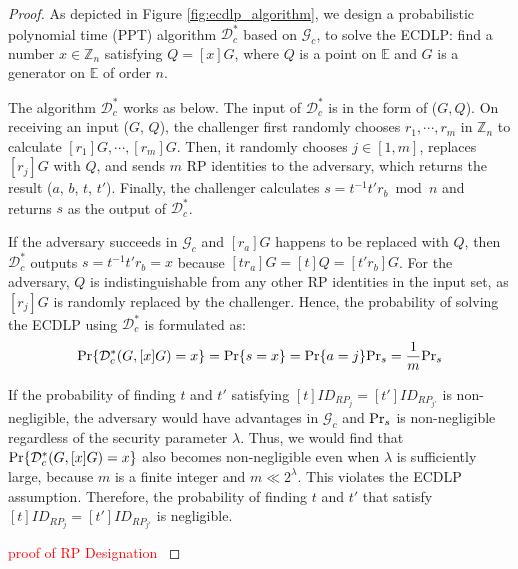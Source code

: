\begin{proof}
As depicted in Figure \ref{fig:ecdlp_algorithm}, we design a probabilistic polynomial time (PPT) algorithm $\mathcal{D}^*_c$ based on $\mathcal{G}_c$, to solve the ECDLP: find a number $x \in \mathbb{Z}_n$ satisfying $Q = [x]G$, where $Q$ is a point on $\mathbb{E}$ and $G$ is a generator on $\mathbb{E}$ of order $n$.




The algorithm $\mathcal{D}^*_c$ works as below.
The input of $\mathcal{D}^*_c$ is in the form of ($G, Q$). On receiving an input ($G$, $Q$), the challenger first randomly chooses $r_1, \cdots, r_m$ in $\mathbb{Z}_n$ to calculate $[r_1]G, \cdots, [r_m]G$.
Then, it randomly chooses $j \in [1,m]$, replaces $[r_j]G$ with $Q$, and sends $m$ RP identities to the adversary, which returns the result ($a$, $b$, $t$, $t'$). Finally, the challenger calculates $s = t^{-1}t'r_b \bmod n$ and returns $s$ as the output of $\mathcal{D}^*_c$.

If the adversary succeeds in $\mathcal{G}_c$ and $[r_a]G$ happens to be replaced with $Q$, then $\mathcal{D}^*_c$ outputs $s=t^{-1}t'r_b =x$ because $[tr_a]G = [t]Q = [t'r_b]G$. For the adversary, $Q$ is indistinguishable from any other RP identities in the input set, as $[r_j]G$ is randomly replaced by the challenger.
Hence, the probability of solving the ECDLP using $\mathcal{D}^*_c$ is formulated as:
\begin{equation*}
{\rm Pr}\{\mathcal{D}^*_c(G, [x]G)=x\} = {\rm Pr}\{s = x\}={\rm Pr}\{a=j\}{\rm Pr}_s=\frac{1}{m}{\rm Pr}_s
\end{equation*}

If the probability of finding $t$ and $t'$ satisfying $[t]ID_{RP_j} = [t']ID_{RP_{j'}}$ is non-negligible, the adversary would have advantages  in $\mathcal{G}_c$ and ${\rm Pr}_s$ is non-negligible regardless of the security parameter $\lambda$.
Thus, we would find that ${\rm Pr}\{\mathcal{D}^*_c(G, [x]G)=x\}$ also becomes non-negligible even when $\lambda$ is sufficiently large, because $m$ is a finite integer and $m \ll 2^\lambda$.
This violates the ECDLP assumption. Therefore, the probability of finding $t$ and $t'$ that satisfy $[t]ID_{RP_j} = [t']ID_{RP_{j'}}$ is negligible. 
	
	
	\textcolor{red}{proof of RP Designation }
  \end{proof}
  
